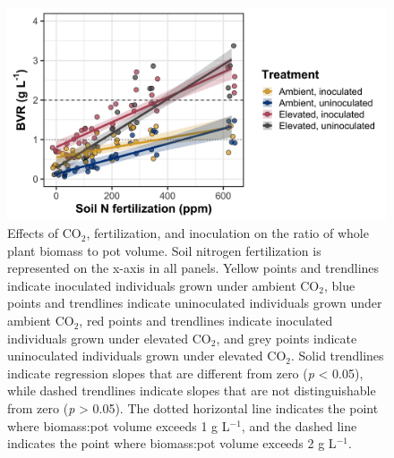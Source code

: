 \newpage
\begin{figure}
    \centering
    \includegraphics[scale = 0.07]{ch5_NxCO2xI/figs/NxCO2xI_figS2_bvr.png}
    \caption[Effects of CO$_2$, fertilization, and inoculation on the ratio of whole plant biomass to pot volume]{Effects of CO$_2$, fertilization, and inoculation on the ratio of whole plant biomass to pot volume. Soil nitrogen fertilization is represented on the x-axis in all panels. Yellow points and trendlines indicate inoculated individuals grown under ambient CO$_2$, blue points and trendlines indicate uninoculated individuals grown under ambient CO$_2$, red points and trendlines indicate inoculated individuals grown under elevated CO$_2$, and grey points indicate uninoculated individuals grown under elevated CO$_2$. Solid trendlines indicate regression slopes that are different from zero (\textit{p} < 0.05), while dashed trendlines indicate slopes that are not distinguishable from zero (\textit{p} > 0.05). The dotted horizontal line indicates the point where biomass:pot volume exceeds 1 g L$^{-1}$, and the dashed line indicates the point where biomass:pot volume exceeds 2 g L$^{-1}$.}
    \label{fig:figure.d2}
\end{figure}
\clearpage
